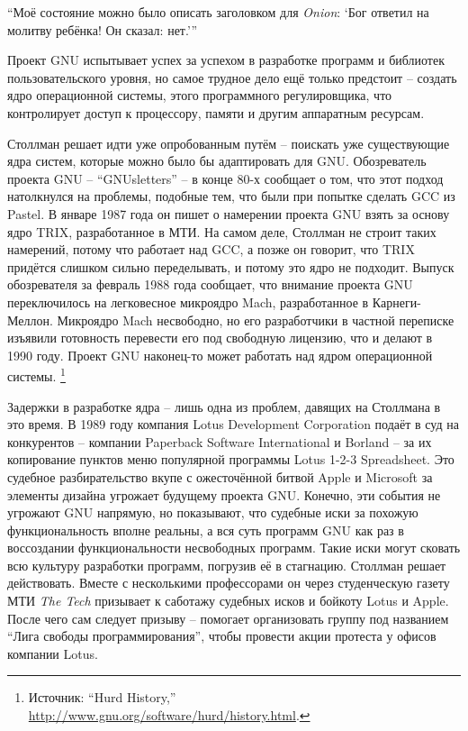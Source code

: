 \enquote{Моё состояние можно было описать заголовком для \textit{Onion}: \hspace{0.01in}\enquote{Бог ответил на молитву ребёнка! Он сказал: нет.}\hspace{0.01in}}

Проект GNU испытывает успех за успехом в разработке программ и библиотек пользовательского уровня, но самое трудное дело ещё только предстоит -- создать ядро операционной системы, этого программного регулировщика, что контролирует доступ к процессору, памяти и другим аппаратным ресурсам.

Столлман решает идти уже опробованным путём -- поискать уже существующие ядра систем, которые можно было бы адаптировать для GNU. Обозреватель проекта GNU -- \enquote{GNUsletters} -- в конце 80-х сообщает о том, что этот подход натолкнулся на проблемы, подобные тем, что были при попытке сделать GCC из Pastel. В январе 1987 года он пишет о намерении проекта GNU взять за основу ядро TRIX, разработанное в МТИ. На самом деле, Столлман не строит таких намерений, потому что работает над GCC, а позже он говорит, что TRIX придётся слишком сильно переделывать, и потому это ядро не подходит. Выпуск обозревателя за февраль 1988 года сообщает, что внимание проекта GNU переключилось на легковесное микроядро Mach, разработанное в Карнеги-Меллон. Микроядро Mach несвободно, но его разработчики в частной переписке изъявили готовность перевести его под свободную лицензию, что и делают в 1990 году. Проект GNU наконец-то может работать над ядром операционной системы. \footnote{Источник: \enquote{Hurd History,} \url{http://www.gnu.org/software/hurd/history.html}.}

Задержки в разработке ядра -- лишь одна из проблем, давящих на Столлмана в это время. В 1989 году компания Lotus Development Corporation подаёт в суд на конкурентов -- компании Paperback Software International и Borland -- за их копирование пунктов меню популярной программы Lotus 1-2-3 Spreadsheet. Это судебное разбирательство вкупе с ожесточённой битвой Apple и Microsoft за элементы дизайна угрожает будущему проекта GNU. Конечно, эти события не угрожают GNU напрямую, но показывают, что судебные иски за похожую функциональность вполне реальны, а вся суть программ GNU как раз в воссоздании функциональности несвободных программ. Такие иски могут сковать всю культуру разработки программ, погрузив её в стагнацию. Столлман решает действовать. Вместе с несколькими профессорами он через студенческую газету МТИ \textit{The Tech} призывает к саботажу судебных исков и бойкоту Lotus и Apple. После чего сам следует призыву -- помогает организовать группу под названием \enquote{Лига свободы программирования}, чтобы провести акции протеста у офисов компании Lotus.

